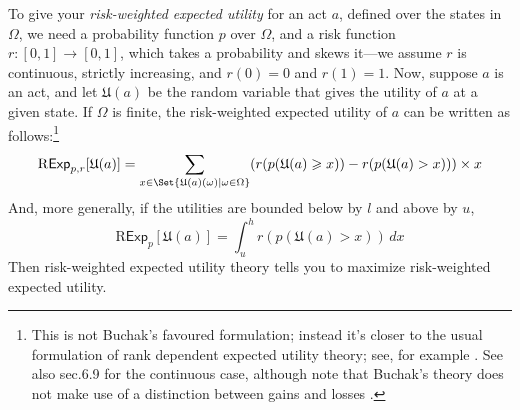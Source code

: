 \documentclass[a4paper]{article}
\newcommand\Exp{\mathsf{Exp}}
\newcommand\RExp{\mathrm{R}\Exp} %
\newcommand\U{\mathfrak{U}} %
\newcommand{\todoold}[2][]{\todo[backgroundcolor=white,bordercolor=orange!10,linecolor=gray!10, #1,caption={},textcolor=gray]{Pre-rev: #2}}
\newcommand\SetDelimiter[1][]{
	\nonscript\,#1\vert \allowbreak \nonscript\,\mathopen{}}
\providecommand\given{\SetDelimiter}
\renewcommand{\geq}{\geqslant}
\newenvironment{CCM rewritten}
{\begingroup\color{blue}} %
{\endgroup}              %
\begin{document}
To give your \emph{risk-weighted expected utility} for an act $a$, defined over the states in $\Omega$, we need a probability function $p$ over $\Omega$, and a risk function $r : [0, 1] \rightarrow [0, 1]$, which takes a probability and skews it---we assume $r$ is continuous, strictly increasing, and $r(0)= 0$ and $r(1) = 1$. Now, suppose $a$ is an act, and let $\U(a)$ be the random variable that gives the utility of $a$ at a given state. 
If $\Omega$ is finite, the risk-weighted expected utility of $a$ can be written as follows:\footnote{This is not Buchak's favoured formulation; instead it's closer to the usual formulation of rank dependent expected utility theory; see, for example \citep[ch.6]{wakker2010prospect}.  See also sec.6.9 for the continuous case, although note that Buchak's theory does not make use of a distinction between gains and losses \citep[see][p59]{buchak2014rr}. }%
$$
\RExp_{p, r}[\U(a)] = \sum_{x \in \Set{\U(a)(\omega)\given \omega \in \Omega}} (r(p(\U(a) \geq x)) - r(p(\U(a) > x)))\times x
$$
And, more generally, if the utilities are bounded below by $l$ and above by $u$,
$$
\RExp_p[\U(a)] = \int^h_{u} r(p(\U(a) > x))\, dx
$$
Then risk-weighted expected utility theory tells you to maximize risk-weighted expected utility.


\end{document}
